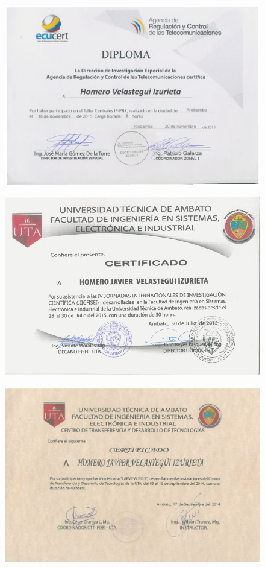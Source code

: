 \begin{figure}[ht]
    \setlength{\parindent}{-20pt}
    \includegraphics[width=\textwidth]{2.-Estudios/Certificados/4.png}
\end{figure}

\begin{figure}[ht]
    \setlength{\parindent}{-20pt}
    \includegraphics[width=\textwidth]{2.-Estudios/Certificados/3.png}
\end{figure}

\begin{figure}[ht]
    \setlength{\parindent}{-20pt}
    \includegraphics[width=\textwidth]{2.-Estudios/Certificados/2.png}
\end{figure}


